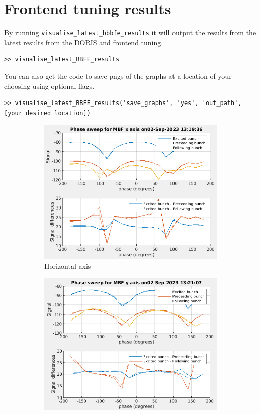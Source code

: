 \documentclass{report}
\begin{document}
\section{Frontend tuning results}
By running \verb|visualise_latest_bbbfe_results| it will output the results from the latest results from the DORIS and frontend tuning.
\begin{verbatim}
>> visualise_latest_BBFE_results
\end{verbatim}
You can also get the code to save pngs of the graphs at a location of your choosing using optional flags.
\begin{verbatim}
>> visualise_latest_BBFE_results('save_graphs', 'yes', 'out_path', [your desired location])
\end{verbatim}
\begin{figure}[hbt]
   \centering
    \begin{subfigure}[b]{0.45\textwidth}
        \includegraphics[width=\textwidth]{vlr_system_phase_scan_x.png}
        \caption{Horizontal axis}
        \label{fig:system_phase_example_x}
    \end{subfigure}
    \begin{subfigure}[b]{0.45\textwidth}
        \includegraphics[width=\textwidth]{vlr_system_phase_scan_y.png}

\end{subfigure}
\end{figure}
\end{document}
